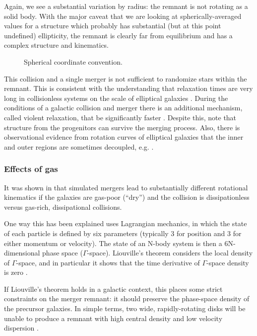\documentclass[twocolumn]{aastex63}
\begin{document}
Again, we see a substantial variation by radius: the remnant is not rotating as a solid body. With the major caveat that we are looking at spherically-averaged values for a structure which probably has substantial (but at this point undefined) ellipticity, the remnant is clearly far from equilibrium and has a complex structure and kinematics.

\begin{figure}[htb!]
	\caption{Spherical coordinate convention.
		\label{fig:sph_coord}}
\end{figure}

This collision and a single merger is not sufficient to randomize stars within the remnant. This is consistent with the understanding that relaxation times are very long in collisionless systems on the scale of elliptical galaxies \citep[Section 1.2]{binney_galactic_2008}. During the conditions of a galactic collision and merger there is an additional mechanism, called violent relaxation, that be significantly faster \citep[Section 4.10.2]{lynden-bell_statistical_1967, binney_galactic_2008}. Despite this, \citet{barnes_dynamics_1992} note that structure from the progenitors can survive the merging process. Also, there is observational evidence from rotation curves of elliptical galaxies that the inner and outer regions are sometimes decoupled, e.g. \citep{napolitano_ngc_2002}.

\subsubsection{Effects of gas}

It was shown in \citep{cox_kinematic_2006} that simulated mergers lead to substantially different rotational kinematics if the galaxies are gas-poor (``dry'') and the collision is dissipationless versus gas-rich, dissipational collisions.

One way this has been explained uses Lagrangian mechanics, in which the state of each particle is defined by six parameters (typically 3 for position and 3 for either momentum or velocity). The state of an N-body system is then a 6N-dimensional phase space ($\Gamma$-space). Liouville's theorem considers the local density of $\Gamma$-space, and in particular it shows that the time derivative of $\Gamma$-space density is zero \citep[Section 7.2.2]{binney_galactic_2008}. 

If Liouville's theorem holds in a galactic context, this places some strict constraints on the merger remnant: it should preserve the phase-space density of the precursor galaxies. In simple terms, two wide, rapidly-rotating disks will be unable to produce a remnant with high central density and low velocity dispersion \citep{carlberg_phase_1986}.
\end{document}
